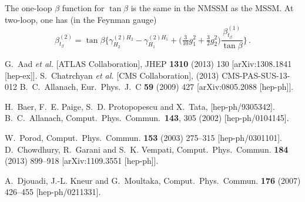 \documentclass[final,3p,times]{elsarticle}
\newcommand{\be}{\begin{equation}}
\newcommand{\ee}{\end{equation}}
\begin{document}
The one-loop $\beta$ function for $\tan\beta$ is the same in the NMSSM as the
MSSM.  At two-loop, one has (in the Feynman gauge)
%
\be
\beta^{(2)}_{t_\beta} = \tan\beta\Bigg\{\gamma^{(2)H_2}_{H_2} - 
\gamma^{(2)H_1}_{H_1} + \Big(\tfrac{3}{10}g_1^2 + \tfrac{3}{2}g_2^2\Big)
\frac{\beta^{(1)}_{t_\beta}}{\tan\beta}\Bigg\}\,.
\ee


\begin{thebibliography}{10}
  G.~Aad {\it et al.}  [ATLAS Collaboration],
  JHEP {\bf 1310} (2013) 130
  [arXiv:1308.1841 [hep-ex]].
S.~Chatrchyan {\it et al.} [CMS Collaboration], (2013) CMS-PAS-SUS-13-012
  B.~C.~Allanach,
  Eur.\ Phys.\ J.\ C {\bf 59} (2009) 427
  [arXiv:0805.2088 [hep-ph]].

H.~Baer, F.~E. Paige, S.~D. Protopopescu and X.~Tata, 
[hep-ph/9305342].
  B.~C.~Allanach,
  Comput.\ Phys.\ Commun.\  {\bf 143}, 305 (2002)
  [hep-ph/0104145].

W.~Porod, 
  Comput.\ Phys.\ Commun. {\bf 153} (2003) 275--315
  [hep-ph/0301101].
D.~Chowdhury, R.~Garani and S.~K. Vempati, 
Comput.\ Phys.\ Commun. {\bf 184} (2013) 899--918
  [arXiv:1109.3551 [hep-ph]].

A.~Djouadi, J.-L. Kneur and G.~Moultaka, 
  Comput.\ Phys.\ Commun. {\bf 176} (2007) 426--455
  [hep-ph/0211331].


\end{thebibliography}
\end{document}
